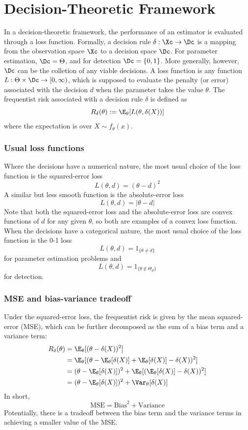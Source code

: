 \chapter{Decision-Theoretic Framework}

In a decision-theoretic framework, the performance of an estimator is evaluated through a loss function.
Formally, a decision rule $\delta : \Xc \to \Dc$ is a mapping from the observation space $\Xc$ to a decision space $\Dc$. For parameter estimation, $\Dc = \Theta$, and for detection $\Dc = \{0, 1\}$. More
generally, however, $\Dc$ can be the colletion of any viable decisions. A loss function is any function $L: \Theta \times \Dc \to [0, \infty)$, which is supposed to evaluate the penalty (or error) associated with the
decision $d$ when the parameter takes the value $\theta$. The frequentist risk associated with a decision rule
$\delta$ is defined as
\[
    R_\delta(\theta) := \E_\theta[L(\theta, \delta(X))]
\]
where the expectation is over $X \sim f_\theta(x)$.
\subsection{Usual loss functions}
Where the decisions have a numerical nature, the most usual choice of the loss function is the squared-error loss
\[
    L(\theta, d) = (\theta - d)^2
\]
A similar but less smooth function is the absolute-error loss
\[
    L(\theta, d) = |\theta - d|
\]
Note that both the squared-error loss and the absolute-error loss are convex functions of $d$ for any given $\theta$, so both are examples of a
convex loss function. When the decisions have a categorical nature, the most usual choice of the loss function is the 0-1 loss
\[
    L(\theta, d) = 1_{\{\theta \neq d\}}
\]
for parameter estimation problems and
\[
    L(\theta, d) = 1_{\{\theta \notin \Theta_d\}}
\]
for detection.
\subsection{MSE and bias-variance tradeoff}
Under the squared-error loss, the frequentist risk is given by the mean squared-error (MSE), which can be further decomposed as the
sum of a bias term and a variance term:
\begin{align*}
    R_\delta(\theta) & = \E_\theta[(\theta - \delta(X))^2]                                                   \\
                     & = \E_\theta[(\theta - \E_\theta[\delta(X)] + \E_\theta[\delta(X)] - \delta(X))^2]     \\
                     & = (\theta - \E_\theta[\delta(X)])^2 + \E_\theta[(\E_\theta[\delta(X)] - \delta(X))^2] \\
                     & = (\theta - \E_\theta[\delta(X)])^2 + \Var_\theta[\delta(X)]
\end{align*}
In short,
\[
    \text{MSE} = \text{Bias}^2 + \text{Variance}
\]
Potentially, there is a tradeoff between the bias term and the variance terms in achieving a smaller value of the MSE.

